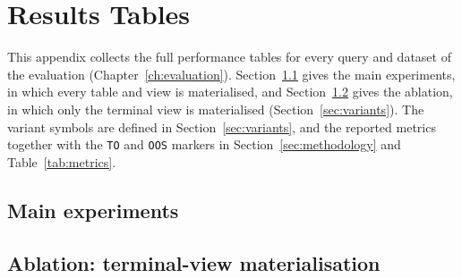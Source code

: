 \chapter{Results Tables}
\label{app:results}

This appendix collects the full performance tables for every query and dataset of the evaluation (Chapter~\ref{ch:evaluation}). Section~\ref{app:results_main} gives the main experiments, in which every table and view is materialised, and Section~\ref{app:results_ablation} gives the ablation, in which only the terminal view is materialised (Section~\ref{sec:variants}). The variant symbols are defined in Section~\ref{sec:variants}, and the reported metrics together with the \texttt{TO} and \texttt{OOS} markers in Section~\ref{sec:methodology} and Table~\ref{tab:metrics}.

\section{Main experiments}
\label{app:results_main}



\section{Ablation: terminal-view materialisation}
\label{app:results_ablation}


